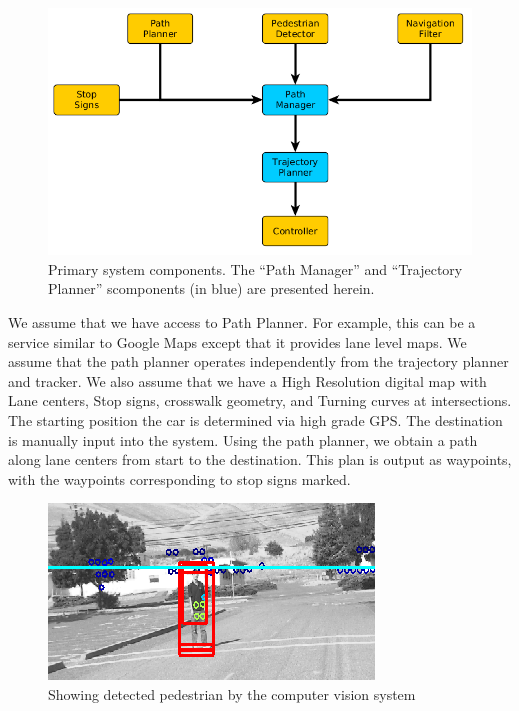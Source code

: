 \documentclass[letterpaper, 10 pt, conference]{ieeeconf}  %
\begin{document}
\begin{figure}[thpb]
  \centering
  \includegraphics[width=1.0\columnwidth]{graphics/MissingReactionPiece2.png}
  \caption{
   Primary system components. The ``Path Manager'' and ``Trajectory Planner'' scomponents (in blue) are presented herein.
  }
  \label{fig:addreact}
\end{figure}

We assume that we have access to Path Planner. For example, this can be a service similar to
Google Maps except that it provides lane level maps. 
We assume that the path planner operates independently from the trajectory planner and tracker.
We also assume that we have a High
Resolution digital map with Lane centers, Stop signs, crosswalk geometry, and Turning 
curves at intersections. The starting position the 
car is determined via high grade GPS. The destination is manually input into the system.
Using the path planner, we obtain a path along lane centers from start to the destination.
This plan is output as waypoints, with the waypoints corresponding to stop signs marked.

\begin{figure}[thpb]
  \centering
  \includegraphics[width=0.5\columnwidth]{graphics/ped3.png}
  \caption{Showing detected pedestrian by the computer vision system
  \newline
  }
  \label{fig:ped}
\end{figure}
\end{document}
